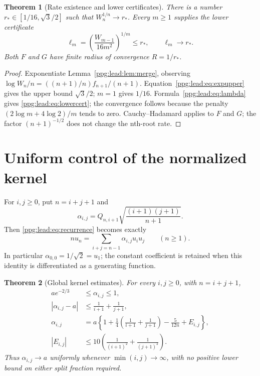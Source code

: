 \documentclass[11pt,letterpaper]{article}
\newtheorem{theorem}{Theorem}[section]
\theoremstyle{remark}\newtheorem{remark}[theorem]{Remark}
\numberwithin{equation}{section}
\begin{document}
\begin{theorem}[Rate existence and lower certificates]\label{ppg:lead:thm:rate}
There is a number $r_*\in[1/16,\sqrt3/2]$ such that $W_n^{1/n}\to r_*$. Every $m\ge1$ supplies the lower certificate
\begin{equation}\label{ppg:lead:eq:lowercert}
 \ell_m=\left(\frac{W_{m-1}}{16m^2}\right)^{1/m}\le r_*,
 \qquad \ell_m\longrightarrow r_*.
\end{equation}
Both $F$ and $G$ have finite radius of convergence $R=1/r_*$.
\end{theorem}
\begin{proof}
Exponentiate Lemma~\ref{ppg:lead:lem:merge}, observing
$\log W_n/n=((n+1)/n)f_{n+1}/(n+1)$. Equation~\eqref{ppg:lead:eq:expupper} gives the upper bound $\sqrt3/2$; $m=1$ gives $1/16$. Formula~\eqref{ppg:lead:eq:lambda} gives \eqref{ppg:lead:eq:lowercert}; the convergence follows because the penalty $(2\log m+4\log2)/m$ tends to zero. Cauchy--Hadamard applies to $F$ and $G$; the factor $(n+1)^{-1/2}$ does not change the nth-root rate.
\end{proof}

\section{Uniform control of the normalized kernel}\label{ppg:lead:sec:kernel}
For $i,j\ge0$, put $n=i+j+1$ and
\begin{equation}\label{ppg:lead:eq:alpha}
 \alpha_{i,j}=Q_{n,i+1}\sqrt{\frac{(i+1)(j+1)}{n+1}}.
\end{equation}
Then \eqref{ppg:lead:eq:recurrence} becomes exactly
\begin{equation}\label{ppg:lead:eq:normalized}
 nu_n=\sum_{i+j=n-1}\alpha_{i,j}u_iu_j\qquad(n\ge1).
\end{equation}
In particular $\alpha_{0,0}=1/\sqrt2=u_1$; the constant coefficient is retained when this identity is differentiated as a generating function.

\begin{theorem}[Global kernel estimates]\label{ppg:lead:thm:kernel}
For every $i,j\ge0$, with $n=i+j+1$,
\begin{align}
 ae^{-2/3}&\le\alpha_{i,j}\le1,\label{ppg:lead:eq:kbound}\\
 |\alpha_{i,j}-a|&\le\frac1{i+1}+\frac1{j+1},\label{ppg:lead:eq:kerror}\\
 \alpha_{i,j}&=a\left\{1+\frac14\left(\frac1{i+1}+\frac1{j+1}\right)
                   -\frac5{12n}+E_{i,j}\right\},\label{ppg:lead:eq:kexpansion}\\
 |E_{i,j}|&\le10\left(\frac1{(i+1)^2}+\frac1{(j+1)^2}\right).\label{ppg:lead:eq:kremainder}
\end{align}
Thus $\alpha_{i,j}\to a$ uniformly whenever $\min(i,j)\to\infty$, with no positive lower bound on either split fraction required.
\end{theorem}
\end{document}
